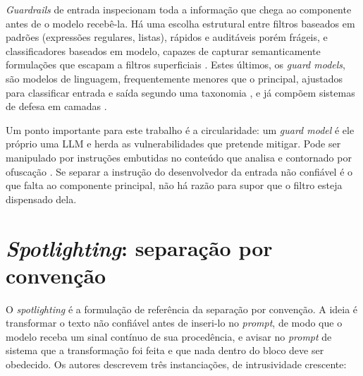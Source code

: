 \textit{Guardrails} de entrada inspecionam toda a informação que chega ao
componente antes de o modelo recebê-la. Há uma escolha estrutural entre filtros
baseados em padrões (expressões regulares, listas), rápidos e auditáveis porém
frágeis, e classificadores baseados em modelo, capazes de capturar semanticamente
formulações que escapam a filtros superficiais \cite{dong2024guardrails}. Estes últimos, os
\textit{guard models}, são modelos de linguagem, frequentemente menores que o
principal, ajustados para classificar entrada e saída segundo uma taxonomia
\cite{inan2023llamaguard, zeng2024shieldgemma, zhao2025qwen3guard}, e já compõem
sistemas de defesa em camadas \cite{chennabasappa2025llamafirewall}.

Um ponto importante para este trabalho é a circularidade: um \textit{guard model} é
ele próprio uma LLM e herda as vulnerabilidades que pretende mitigar. Pode ser
manipulado por instruções embutidas no conteúdo que analisa e contornado por
ofuscação \cite{hackett2025bypassing}. Se separar a instrução do desenvolvedor
da entrada não confiável é o que falta ao componente principal, não há razão para supor que o filtro esteja
dispensado dela.

\section{\textit{Spotlighting}: separação por convenção}\label{sec:spotlighting}

O \textit{spotlighting} \cite{hines2024spotlighting} é a formulação de
referência da separação por convenção. A ideia é transformar o texto não
confiável antes de inseri-lo no \textit{prompt}, de modo que o modelo receba um
sinal contínuo de sua procedência, e avisar no \textit{prompt} de sistema que a
transformação foi feita e que nada dentro do bloco deve ser obedecido. Os
autores descrevem três instanciações, de intrusividade crescente:

